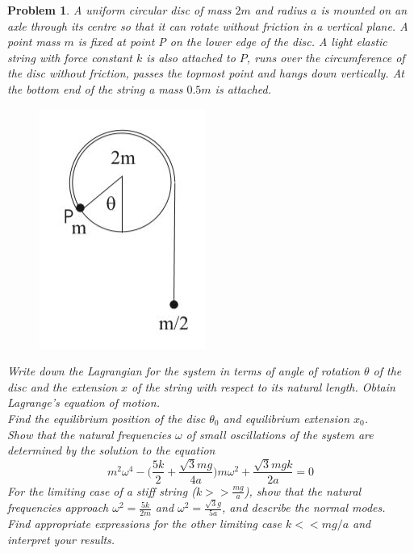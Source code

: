 \documentclass[a4paper]{article}
\theoremstyle{new}
\newtheorem{qns}{Problem}[section]
\begin{document}
\newpage
\begin{qns}
A uniform circular disc of mass $2m$ and radius $a$ is mounted on an axle through its centre so that it can rotate without friction in a vertical plane. A point mass $m$ is fixed at point P on the lower edge of the disc. A light elastic string with force constant $k$ is also attached to $P$, runs over the circumference of the disc without friction, passes the topmost point and hangs down vertically. At the bottom end of the string a mass $0.5m$ is attached.
\begin{figure}[H]
    \centering
    \includegraphics[scale=0.5]{Q1.JPG}
\end{figure}
Write down the Lagrangian for the system in terms of angle of rotation $\theta$ of the disc and the extension $x$ of the string with respect to its natural length. Obtain Lagrange's equation of motion.\\[5pt]
Find the equilibrium position of the disc $\theta_0$ and equilibrium extension $x_0$.\\[5pt]
Show that the natural frequencies $\omega$ of small oscillations of the system are determined by the solution to the equation
$$m^2\omega^4-\bigg(\frac{5k}{2}+\frac{\sqrt{3}mg}{4a}\bigg)m\omega^2+\frac{\sqrt{3}mgk}{2a}=0$$
For the limiting case of a stiff string ($k>>\frac{mg}{a}$), show that the natural frequencies approach $\omega^2=\frac{5k}{2m}$ and $\omega^2=\frac{\sqrt{3}g}{5a}$, and describe the normal modes.\\[5pt]
Find appropriate expressions for the other limiting case $k<<mg/a$ and interpret your results.
\end{qns}
\end{document}

